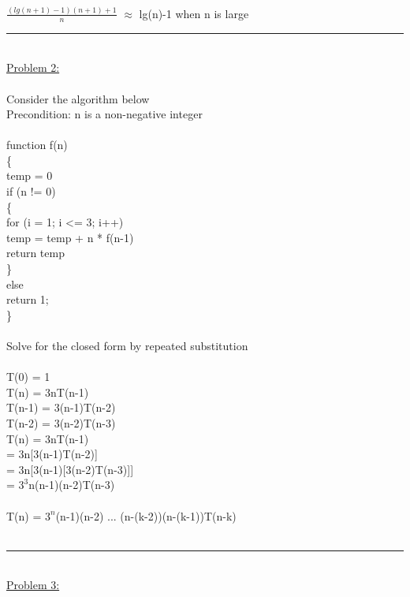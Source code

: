 \documentclass{article}
\begin{document}
    \\
    \indent $\frac{(lg(n+1)-1)(n+1)+1}{n}$ $\approx$ lg(n)-1 when n is large\\
    \rule{\textwidth}{0.5pt}\\
    \underline{Problem 2:}\\\\
    Consider the algorithm below\\Precondition: n is a non-negative integer\\
    \\
    function f(n)\\
    \{\\
    \indent temp = 0\\
    \indent if (n != 0)\\
    \indent \{\\
    \indent \indent for (i = 1; i <= 3; i++)\\
    \indent \indent \indent temp = temp + n * f(n-1)\\
    \indent \indent return temp\\
    \indent \}\\
    \indent else\\
    \indent \indent return 1;\\
    \}\\
    \\
    Solve for the closed form by repeated substitution\\
    \\
    \indent T(0) = 1\\
    \indent T(n) = 3nT(n-1)\\
    \indent T(n-1) = 3(n-1)T(n-2)\\
    \indent T(n-2) = 3(n-2)T(n-3)\\
    \indent T(n) = 3nT(n-1)\\
    \indent\hspace{0.73cm} = 3n[3(n-1)T(n-2)]\\
    \indent\hspace{0.73cm} = 3n[3(n-1)[3(n-2)T(n-3)]]\\
    \indent\hspace{0.73cm} = $3^3$n(n-1)(n-2)T(n-3)\\
    \\
    \indent T(n) = $3^n$(n-1)(n-2) ... (n-(k-2))(n-(k-1))T(n-k)\\
    \\
    \rule{\textwidth}{0.5pt}\\
    \underline{Problem 3:}\\\\
\end{document}
